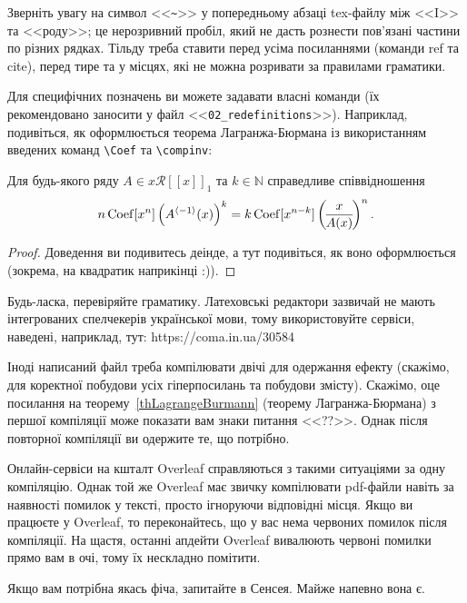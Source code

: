 Зверніть увагу на символ <<\verb|~|>> у попередньому абзаці tex-файлу між
<<I>> та <<роду>>; це нерозривний пробіл, який не дасть рознести пов'язані
частини по різних рядках. Тільду треба ставити перед усіма посиланнями
(команди ref та cite), перед тире та у місцях, які не можна розривати за
правилами граматики.

Для специфічних позначень ви можете задавати власні команди (їх
рекомендовано заносити у файл <<\verb|02_redefinitions|>>). Наприклад,
подивіться, як оформлюється теорема Лагранжа-Бюрмана із використанням
введених команд \verb|\Coef| та \verb|\compinv|:

\begin{theorem} \label{thLagrangeBurmann}
    Для будь-якого ряду $A \in x \mathcal R[[x]]_1$ та $k \in \mathbb N$ справедливе співвідношення
    $$n \operatorname{Coef}[x^n] \left( A^{\left\langle -1 \right\rangle}(x) \right)^k = k \operatorname{Coef}[x^{n-k}] \left(\! \frac{x}{A(x)} \!\right)^n.$$
\end{theorem}
\begin{proof}
    Доведення ви подивитесь деінде, а тут подивіться, як воно оформлюється
    (зокрема, на квадратик наприкінці :)).
\end{proof}

\begin{corollary} \par %
    Будь-ласка, перевіряйте граматику. Латеховські редактори зазвичай не мають
    інтегрованих спелчекерів української мови, тому використовуйте сервіси,
    наведені, наприклад, тут: https://coma.in.ua/30584
\end{corollary}

Іноді написаний файл треба компілювати двічі для одержання ефекту
(скажімо, для коректної побудови усіх гіперпосилань та побудови змісту).
Скажімо, оце посилання на теорему~\ref{thLagrangeBurmann} (теорему
Лагранжа-Бюрмана) з першої компіляції може показати вам знаки питання
<<??>>. Однак після повторної компіляції ви одержите те, що потрібно.

Онлайн-сервіси на кшталт Overleaf справляються з такими ситуаціями за одну компіляцію. Однак той
же Overleaf має звичку компілювати pdf-файли навіть за наявності помилок у
тексті, просто ігноруючи відповідні місця. Якщо ви працюєте у Overleaf,
то переконайтесь, що у вас нема червоних помилок після компіляції. На
щастя, останні апдейти Overleaf вивалюють червоні помилки прямо вам в очі,
тому їх нескладно помітити.

Якщо вам потрібна якась фіча, запитайте в Сенсея. Майже напевно вона є.

